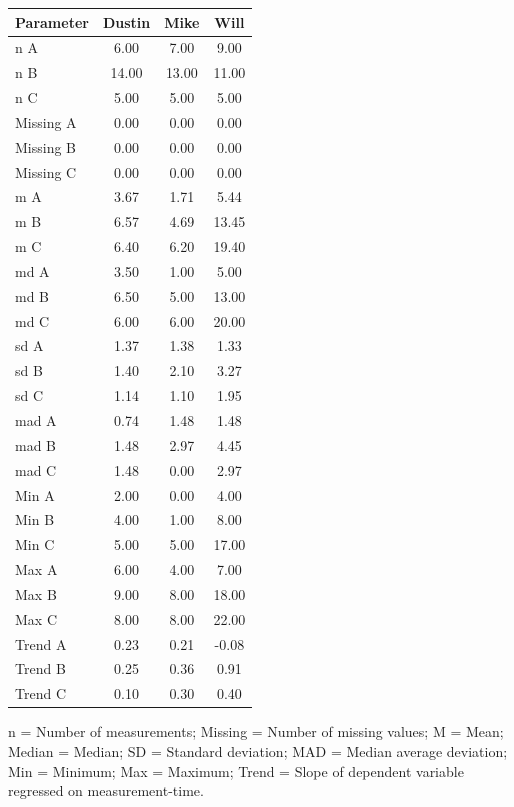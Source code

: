 \documentclass[
]{book}
\begin{document}
\begin{table}
\centering
\begin{tabular}{lccc}
\toprule
Parameter & Dustin & Mike & Will\\
\midrule
n A & 6.00 & 7.00 & 9.00\\
n B & 14.00 & 13.00 & 11.00\\
n C & 5.00 & 5.00 & 5.00\\
Missing A & 0.00 & 0.00 & 0.00\\
Missing B & 0.00 & 0.00 & 0.00\\
\addlinespace
Missing C & 0.00 & 0.00 & 0.00\\
m A & 3.67 & 1.71 & 5.44\\
m B & 6.57 & 4.69 & 13.45\\
m C & 6.40 & 6.20 & 19.40\\
md A & 3.50 & 1.00 & 5.00\\
\addlinespace
md B & 6.50 & 5.00 & 13.00\\
md C & 6.00 & 6.00 & 20.00\\
sd A & 1.37 & 1.38 & 1.33\\
sd B & 1.40 & 2.10 & 3.27\\
sd C & 1.14 & 1.10 & 1.95\\
\addlinespace
mad A & 0.74 & 1.48 & 1.48\\
mad B & 1.48 & 2.97 & 4.45\\
mad C & 1.48 & 0.00 & 2.97\\
Min A & 2.00 & 0.00 & 4.00\\
Min B & 4.00 & 1.00 & 8.00\\
\addlinespace
Min C & 5.00 & 5.00 & 17.00\\
Max A & 6.00 & 4.00 & 7.00\\
Max B & 9.00 & 8.00 & 18.00\\
Max C & 8.00 & 8.00 & 22.00\\
Trend A & 0.23 & 0.21 & -0.08\\
\addlinespace
Trend B & 0.25 & 0.36 & 0.91\\
Trend C & 0.10 & 0.30 & 0.40\\
\bottomrule
\end{tabular}
\end{table}

n = Number of measurements; Missing = Number of missing values; M = Mean; Median = Median; SD = Standard deviation; MAD = Median average deviation; Min = Minimum; Max = Maximum; Trend = Slope of dependent variable regressed on measurement-time.
\end{document}
